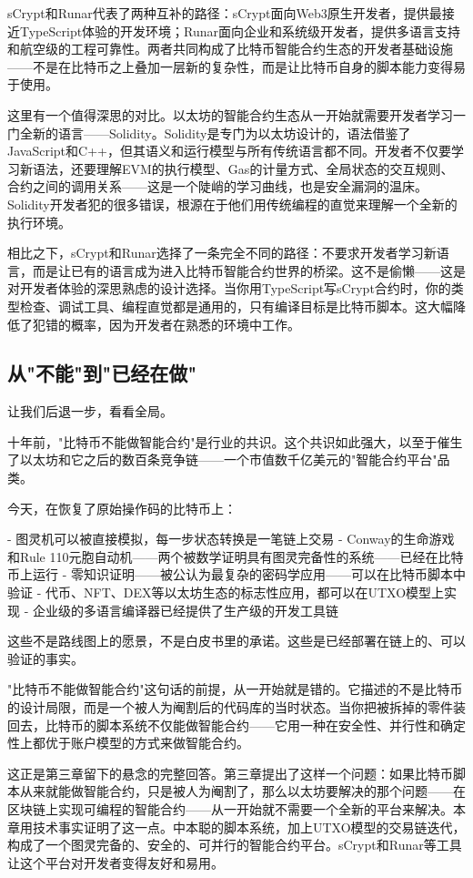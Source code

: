 \documentclass[a4paper,12pt,openany]{ctexbook}
\begin{document}
sCrypt和Runar代表了两种互补的路径：sCrypt面向Web3原生开发者，提供最接近TypeScript体验的开发环境；Runar面向企业和系统级开发者，提供多语言支持和航空级的工程可靠性。两者共同构成了比特币智能合约生态的开发者基础设施——不是在比特币之上叠加一层新的复杂性，而是让比特币自身的脚本能力变得易于使用。

这里有一个值得深思的对比。以太坊的智能合约生态从一开始就需要开发者学习一门全新的语言——Solidity。Solidity是专门为以太坊设计的，语法借鉴了JavaScript和C++，但其语义和运行模型与所有传统语言都不同。开发者不仅要学习新语法，还要理解EVM的执行模型、Gas的计量方式、全局状态的交互规则、合约之间的调用关系——这是一个陡峭的学习曲线，也是安全漏洞的温床。Solidity开发者犯的很多错误，根源在于他们用传统编程的直觉来理解一个全新的执行环境。

相比之下，sCrypt和Runar选择了一条完全不同的路径：不要求开发者学习新语言，而是让已有的语言成为进入比特币智能合约世界的桥梁。这不是偷懒——这是对开发者体验的深思熟虑的设计选择。当你用TypeScript写sCrypt合约时，你的类型检查、调试工具、编程直觉都是通用的，只有编译目标是比特币脚本。这大幅降低了犯错的概率，因为开发者在熟悉的环境中工作。


\subsection*{从"不能"到"已经在做"}


让我们后退一步，看看全局。

十年前，"比特币不能做智能合约"是行业的共识。这个共识如此强大，以至于催生了以太坊和它之后的数百条竞争链——一个市值数千亿美元的"智能合约平台"品类。

今天，在恢复了原始操作码的比特币上：

- 图灵机可以被直接模拟，每一步状态转换是一笔链上交易
- Conway的生命游戏和Rule 110元胞自动机——两个被数学证明具有图灵完备性的系统——已经在比特币上运行
- 零知识证明——被公认为最复杂的密码学应用——可以在比特币脚本中验证
- 代币、NFT、DEX等以太坊生态的标志性应用，都可以在UTXO模型上实现
- 企业级的多语言编译器已经提供了生产级的开发工具链

这些不是路线图上的愿景，不是白皮书里的承诺。这些是已经部署在链上的、可以验证的事实。

"比特币不能做智能合约"这句话的前提，从一开始就是错的。它描述的不是比特币的设计局限，而是一个被人为阉割后的代码库的当时状态。当你把被拆掉的零件装回去，比特币的脚本系统不仅能做智能合约——它用一种在安全性、并行性和确定性上都优于账户模型的方式来做智能合约。

这正是第三章留下的悬念的完整回答。第三章提出了这样一个问题：如果比特币脚本从来就能做智能合约，只是被人为阉割了，那么以太坊要解决的那个问题——在区块链上实现可编程的智能合约——从一开始就不需要一个全新的平台来解决。本章用技术事实证明了这一点。中本聪的脚本系统，加上UTXO模型的交易链迭代，构成了一个图灵完备的、安全的、可并行的智能合约平台。sCrypt和Runar等工具让这个平台对开发者变得友好和易用。
\end{document}
